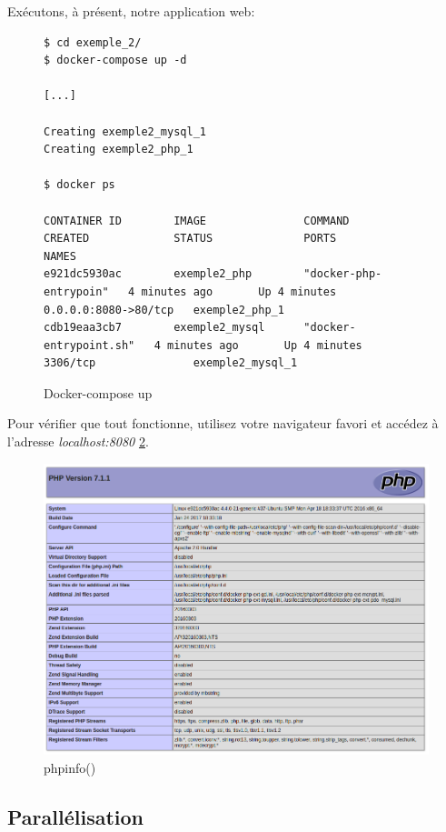 Exécutons, à présent, notre application web:

\begin{figure}[H] 
\centering 
\begin{lstlisting}[frame=single]
$ cd exemple_2/
$ docker-compose up -d

[...]

Creating exemple2_mysql_1
Creating exemple2_php_1

$ docker ps

CONTAINER ID        IMAGE               COMMAND                  CREATED             STATUS              PORTS                  NAMES
e921dc5930ac        exemple2_php        "docker-php-entrypoin"   4 minutes ago       Up 4 minutes        0.0.0.0:8080->80/tcp   exemple2_php_1
cdb19eaa3cb7        exemple2_mysql      "docker-entrypoint.sh"   4 minutes ago       Up 4 minutes        3306/tcp               exemple2_mysql_1

\end{lstlisting}
\caption[Docker-compose up]{Docker-compose up}
\label{fig:composeUp} 
\end{figure}

Pour vérifier que tout fonctionne, utilisez votre navigateur favori et accédez à l'adresse \emph{localhost:8080} \ref{fig:phpinfo}.

\begin{figure}[H] 
\centering 
\includegraphics[width=1\columnwidth]{img/phpinfo} 
\caption[phpinfo]{phpinfo()}
\label{fig:phpinfo} 
\end{figure}

\subsection{Parallélisation}

